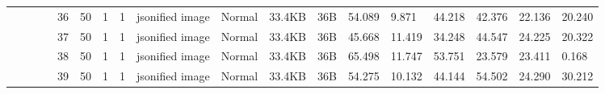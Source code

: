 \begin{landscape}
\begin{table}[]
{\begin{tabular}{@{}ccccllllllllllllll@{}}
                                                                                   &                              &                                &                                                                                                          & 36                                                    & 50                                       & 1                                          & 1                                 & jsonified image                  & Normal                             & 33.4KB                                        & 36B                                             & 54.089                  & 9.871    & 44.218                       & 42.376                  & 22.136   & 20.240                       \\
                                                                                   &                              &                                &                                                                                                          & 37                                                    & 50                                       & 1                                          & 1                                 & jsonified image                  & Normal                             & 33.4KB                                        & 36B                                             & 45.668                  & 11.419   & 34.248                       & 44.547                  & 24.225   & 20.322                       \\
                                                                                   &                              &                                &                                                                                                          & 38                                                    & 50                                       & 1                                          & 1                                 & jsonified image                  & Normal                             & 33.4KB                                        & 36B                                             & 65.498                  & 11.747   & 53.751                       & 23.579                  & 23.411   & 0.168                        \\
                                                                                   &                              &                                &                                                                                                          & 39                                                    & 50                                       & 1                                          & 1                                 & jsonified image                  & Normal                             & 33.4KB                                        & 36B                                             & 54.275                  & 10.132   & 44.144                       & 54.502                  & 24.290   & 30.212                       \\

\end{tabular}}
\end{table}
\end{landscape}

